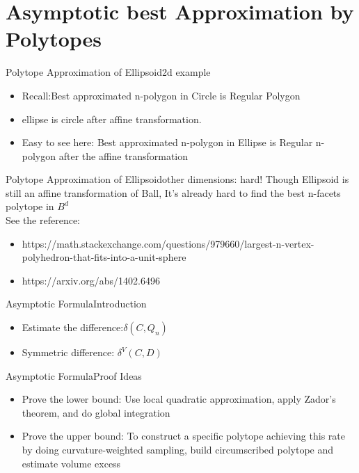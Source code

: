 \documentclass[
  english,            %
  aspectratio=169,    %
]{tumbeamer}
\begin{document}
\section{Asymptotic best Approximation by Polytopes}
\begin{frame}{Polytope Approximation of Ellipsoid}{2d example}
  \begin{itemize}
    \item Recall:Best approximated n-polygon in Circle is Regular Polygon 
    \item ellipse is circle after affine transformation.
    \item Easy to see here: Best approximated n-polygon in Ellipse is Regular n-polygon after the affine transformation
  \end{itemize}
\end{frame}

\begin{frame}{Polytope Approximation of Ellipsoid}{other dimensions: hard!}
 Though Ellipsoid is still an affine transformation of Ball, It's already hard to find the best n-facets polytope in $B^{d}$
 \\
 See the reference:
  \begin{itemize}
     \item https://math.stackexchange.com/questions/979660/largest-n-vertex-polyhedron-that-fits-into-a-unit-sphere
     \item https://arxiv.org/abs/1402.6496
  \end{itemize}
\end{frame}


\begin{frame}{Asymptotic Formula}{Introduction}
    \begin{itemize}
        \item Estimate the difference:$\delta(C,Q_{n})$
        \item Symmetric difference: $\delta^{V}(C,D)$
    \end{itemize}
\end{frame}

\begin{frame}{Asymptotic Formula}{Proof Ideas}
    \begin{itemize}
        \item Prove the lower bound: Use local quadratic approximation, apply Zador's theorem, and do global integration
        \item Prove the upper bound: To construct a specific polytope achieving this rate by doing curvature-weighted sampling, build circumscribed polytope and estimate volume excess
    \end{itemize}
\end{frame}
\end{document}
